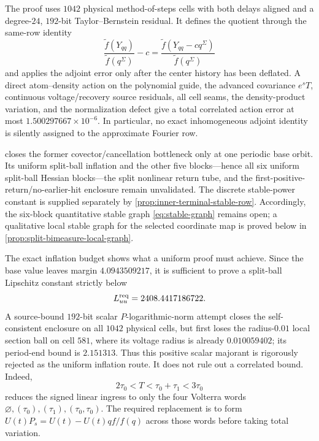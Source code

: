 The proof uses \(1042\) physical method-of-steps cells with both delays
aligned and a degree-\(24\), \(192\)-bit Taylor--Bernstein residual.  It
defines the quotient through the same-row identity
\[
 \frac{\widetilde f(Y_{qq})}{\widetilde f(q^\Sigma)}-c
 =\frac{\widetilde f(Y_{qq}-cq^\Sigma)}
        {\widetilde f(q^\Sigma)}
\]
and applies the adjoint error only after the center history has been
deflated.  A direct atom--density action on the polynomial guide, the
advanced covariance \(e^sT\), continuous voltage/recovery source residuals,
all cell seams, the density-product variation, and the normalization defect
give a total correlated action error at most
\(1.500297667\times10^{-6}\).  In particular, no exact inhomogeneous
adjoint identity is silently assigned to the approximate Fourier row.

 closes the former covector/cancellation bottleneck only
at one periodic base orbit.  Its uniform split-ball inflation and the other
five blocks---hence all six uniform split-ball Hessian blocks---the split
nonlinear return tube, and the first-positive-return/no-earlier-hit enclosure
remain unvalidated.  The discrete stable-power constant is supplied separately
by \cref{prop:inner-terminal-stable-row}.  Accordingly, the six-block
quantitative stable graph \cref{eq:stable-graph} remains open; a qualitative
local stable graph for the selected coordinate map is proved below in
\cref{prop:split-bimeasure-local-graph}.

The exact inflation budget shows what a uniform proof must achieve.  Since
the base value leaves margin \(4.0943509217\), it is sufficient to prove a
split-ball Lipschitz constant strictly below
\[
 L_{uu}^{\rm req}=2408.4417186722.
\]
A source-bound \(192\)-bit scalar \(P\)-logarithmic-norm attempt closes the
self-consistent enclosure on all \(1042\) physical cells, but first loses
the radius-\(0.01\) local section ball on cell \(581\), where its voltage
radius is already \(0.010059402\); its period-end bound is \(2.151313\).
Thus this positive scalar majorant is rigorously rejected as the uniform
inflation route.  It does not rule out a correlated bound.  Indeed,
\[
 2\tau_0<T<\tau_0+\tau_1<3\tau_0
\]
reduces the signed linear ingress to only the four Volterra words
\(\varnothing,(\tau_0),(\tau_1),(\tau_0,\tau_0)\).  The required replacement
is to form \(U(t)P_s=U(t)-U(t)qf/f(q)\) across those words before taking
total variation.

